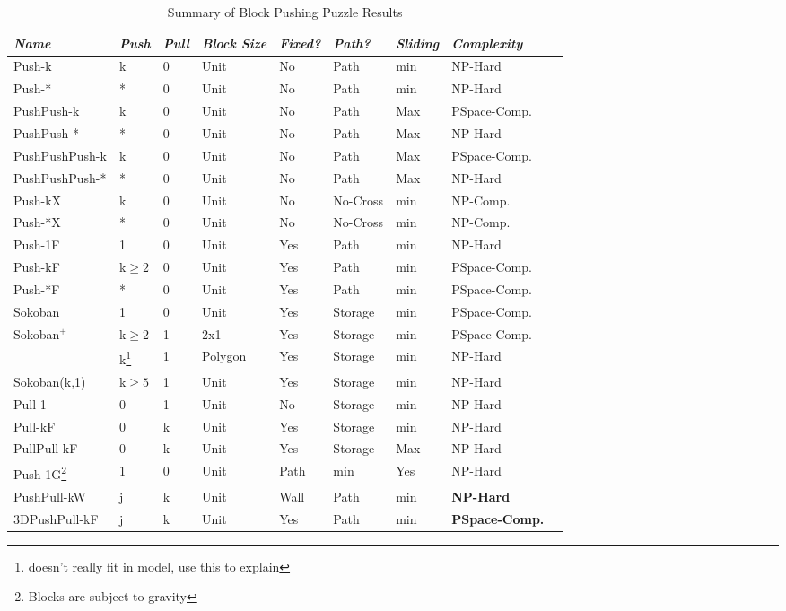 \documentclass[11pt]{article}
\begin{document}
\begin{table}[ht]
\centering
\begin{tabular}{|l|l|l|l|l|l|l|l|l|}
\hline
\emph{Name} & \emph{Push} & \emph{Pull} & \emph{Block Size} & \emph{Fixed?} & \emph{Path?} & \emph{Sliding} & \emph{Complexity} \\ \hline
\hline
Push-k & k & 0 & Unit & No & Path & min & NP-Hard\cite{Push100} \\ \hline
Push-* & * & 0 & Unit & No & Path  & min & NP-Hard\cite{Push*00} \\ \hline
PushPush-k & k & 0 & Unit & No & Path  & Max & PSpace-Comp.\cite{PushPushk04} \\ \hline
PushPush-* & * & 0 & Unit & No & Path  & Max & NP-Hard\cite{Push*00} \\ \hline
PushPushPush-k & k & 0 & Unit & No & Path  & Max & PSpace-Comp.\cite{} \\ \hline
PushPushPush-* & * & 0 & Unit & No & Path  & Max & NP-Hard\cite{} \\ \hline
Push-kX & k & 0 & Unit & No & No-Cross  & min & NP-Comp.\cite{non-crossing01} \\ \hline
Push-*X & * & 0 & Unit & No & No-Cross  & min & NP-Comp.\cite{non-crossing01} \\ \hline
Push-1F & 1 & 0 & Unit & Yes & Path  & min &  NP-Hard \cite{DO92} \\ \hline
Push-kF & k$\geq 2$ & 0 & Unit & Yes & Path  & min & PSpace-Comp.\cite{Push2F02} \\ \hline
Push-*F & * & 0 & Unit & Yes & Path  & min & PSpace-Comp.\cite{Push2F02} \\ \hline
Sokoban & 1 & 0 & Unit & Yes & Storage  & min & PSpace-Comp.\cite{Sokoban98} \\ \hline
Sokoban$^+$ & k$\geq 2$ & 1 & 2x1 & Yes & Storage  & min & PSpace-Comp.\cite{DZ96} \\ \hline
 & k\footnote{doesn't really fit in model, use this to explain} & 1  & Polygon & Yes & Storage  & min & NP-Hard\cite{PushPull91}\\ \hline
Sokoban(k,1) & k$\geq 5$ & 1 & Unit & Yes & Storage  & min & NP-Hard\cite{DZ96} \\ \hline
Pull-1 & 0 & 1 & Unit & No & Storage  & min & NP-Hard\cite{Pull10} \\ \hline
Pull-kF & 0 & k & Unit & Yes & Storage  & min &  NP-Hard\cite{Pull10} \\ \hline
PullPull-kF & 0 & k & Unit & Yes & Storage  & Max  & NP-Hard\cite{Pull10} \\ \hline
Push-1G\footnote{Blocks are subject to gravity} & 1 & 0 & Unit &  Path  & min & Yes & NP-Hard\cite{Gravity} \\ \hline
PushPull-kW & j & k & Unit & Wall & Path  & min & \textbf{NP-Hard} \\ \hline
3DPushPull-kF & j & k & Unit & Yes & Path & min &  \textbf{PSpace-Comp.} \\ \hline

\end{tabular}
\caption{Summary of Block Pushing Puzzle Results}
\label{BlocksTable}
\end{table}
\end{document}
